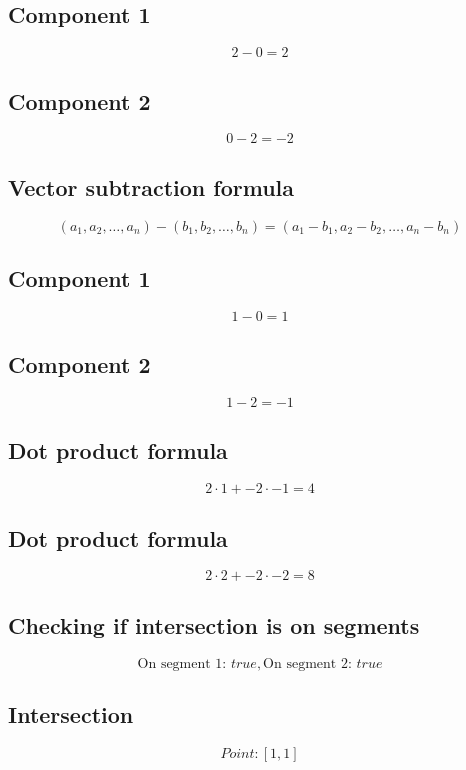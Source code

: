 \documentclass{article}
\begin{document}
\subsection*{ \vspace{1em} Component 1}
\[
2 - 0 = 2
\]
\subsection*{ \vspace{1em} Component 2}
\[
0 - 2 = -2
\]
\subsection*{ \vspace{1em} Vector subtraction formula}
\[
(a_1, a_2, \dots, a_n) - (b_1, b_2, \dots, b_n) = (a_1 - b_1, a_2 - b_2, \dots, a_n - b_n)
\]
\subsection*{ \vspace{1em} Component 1}
\[
1 - 0 = 1
\]
\subsection*{ \vspace{1em} Component 2}
\[
1 - 2 = -1
\]
\subsection*{ \vspace{1em} Dot product formula}
\[
2 \cdot 1 + -2 \cdot -1 = 4
\]
\subsection*{ \vspace{1em} Dot product formula}
\[
2 \cdot 2 + -2 \cdot -2 = 8
\]
\subsection*{ \vspace{1em} Checking if intersection is on segments}
\[
\text{On segment 1: } true, \text{On segment 2: } true
\]
\subsection*{ \vspace{1em} Intersection}
\[
Point: [1, 1]
\]
\bigskip

\hrulefill
\bigskip
\end{document}
